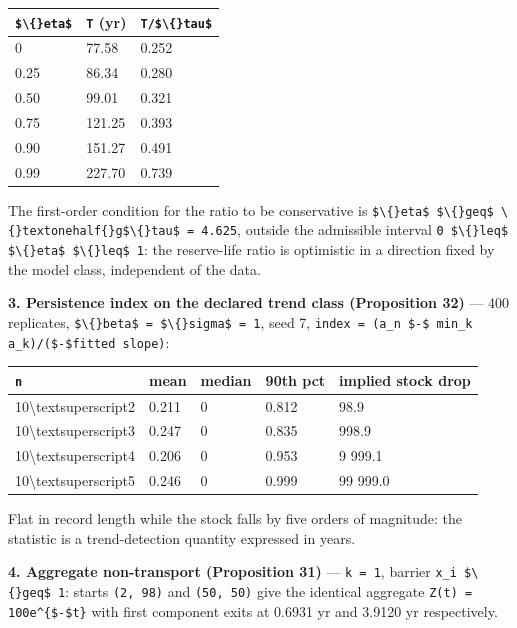 \documentclass[11pt]{article}
\begin{document}
\begin{longtable}{@{}l|l|l@{}}
\toprule
\texttt{\$\textbackslash\{\}eta\$} & \texttt{T} (yr) & \texttt{T/\$\textbackslash\{\}tau\$} \\
\midrule
0 & 77.58 & 0.252 \\
0.25 & 86.34 & 0.280 \\
0.50 & 99.01 & 0.321 \\
0.75 & 121.25 & 0.393 \\
0.90 & 151.27 & 0.491 \\
0.99 & 227.70 & 0.739 \\
\bottomrule
\end{longtable}

The first-order condition for the ratio to be conservative is \texttt{\$\textbackslash\{\}eta\$ \$\textbackslash\{\}geq\$ \textbackslash\{\}textonehalf\{\}g\$\textbackslash\{\}tau\$ = 4.625}, outside the admissible interval \texttt{0 \$\textbackslash\{\}leq\$ \$\textbackslash\{\}eta\$ \$\textbackslash\{\}leq\$ 1}: the reserve-life ratio is optimistic in a direction fixed by the model class, independent of the data.

\textbf{3. Persistence index on the declared trend class (Proposition 32)} --- 400 replicates, \texttt{\$\textbackslash\{\}beta\$ = \$\textbackslash\{\}sigma\$ = 1}, seed 7, \texttt{index = (a\_n \$-\$ min\_k a\_k)/(\$-\$fitted slope)}:

\begin{longtable}{@{}l|l|l|l|l@{}}
\toprule
\texttt{n} & mean & median & 90th pct & implied stock drop \\
\midrule
10\textbackslash{}textsuperscript{2} & 0.211 & 0 & 0.812 & 98.9 \\
10\textbackslash{}textsuperscript{3} & 0.247 & 0 & 0.835 & 998.9 \\
10\textbackslash{}textsuperscript{4} & 0.206 & 0 & 0.953 & 9 999.1 \\
10\textbackslash{}textsuperscript{5} & 0.246 & 0 & 0.999 & 99 999.0 \\
\bottomrule
\end{longtable}

Flat in record length while the stock falls by five orders of magnitude: the statistic is a trend-detection quantity expressed in years.

\textbf{4. Aggregate non-transport (Proposition 31)} --- \texttt{k = 1}, barrier \texttt{x\_i \$\textbackslash\{\}geq\$ 1}: starts \texttt{(2, 98)} and \texttt{(50, 50)} give the identical aggregate \texttt{Z(t) = 100e\textasciicircum{}\{\$-\$t\}} with first component exits at 0.6931 yr and 3.9120 yr respectively.
\end{document}
